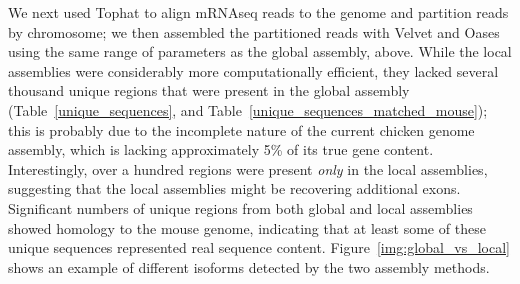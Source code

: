 We next used Tophat to align mRNAseq reads to the genome and partition
reads by chromosome; we then assembled the partitioned reads with
Velvet and Oases using the same range of parameters as the global
assembly, above.  While the local assemblies were considerably more
computationally efficient, they lacked several thousand unique regions
that were present in the global assembly (Table~\ref{unique_sequences},
and Table~\ref{unique_sequences_matched_mouse}); this is probably due to the
incomplete nature of the current chicken genome assembly, which is lacking
approximately 5\% of its true gene content.  Interestingly, over a
hundred regions were present {\em only} in the local assemblies,
suggesting that the local assemblies might be recovering additional exons.
Significant numbers of unique regions from both global and local assemblies
showed homology to the mouse genome, indicating that at least some of these
unique sequences represented real sequence content.
Figure~\ref{img:global_vs_local} shows an example of different isoforms detected by
the two assembly methods.

